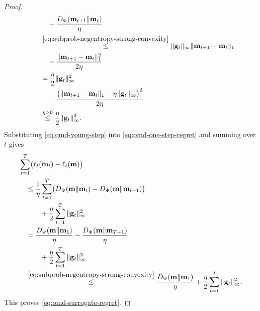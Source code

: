 \documentclass[journal]{IEEEtran}
\theoremstyle{remark}
\begin{document}
\begin{proof}
\begin{equation}
\begin{aligned}
&\qquad\quad-\frac{D_\Psi(\mathbf{m}_{t+1}\|\mathbf{m}_t)}{\eta}\\
&\qquad\overset{\eqref{eq:subprob-negentropy-strong-convexity}}{\le}
\|\mathbf{g}_t\|_\infty\|\mathbf{m}_{t+1}-\mathbf{m}_t\|_1\\
&\qquad\quad-\frac{\|\mathbf{m}_{t+1}-\mathbf{m}_t\|_1^2}{2\eta} \\
&\qquad=\frac{\eta}{2}\|\mathbf{g}_t\|_\infty^2\\
&\qquad\quad-\frac{\bigl(\|\mathbf{m}_{t+1}-\mathbf{m}_t\|_1
-\eta\|\mathbf{g}_t\|_\infty\bigr)^2}{2\eta}\\
&\qquad\overset{\eta>0}{\le}
\frac{\eta}{2}\|\mathbf{g}_t\|_\infty^2.
\end{aligned}
\end{equation}
Substituting \eqref{eq:omd-young-step} into
\eqref{eq:omd-one-step-regret} and summing over $t$ gives
\[
\begin{aligned}
&\sum_{t=1}^T\bigl(\ell_t(\mathbf{m}_t)-\ell_t(\mathbf{m})\bigr)\\
&\quad\le\frac{1}{\eta}\sum_{t=1}^T
\bigl(D_\Psi(\mathbf{m}\|\mathbf{m}_t)
-D_\Psi(\mathbf{m}\|\mathbf{m}_{t+1})\bigr)\\
&\qquad\quad+
\frac{\eta}{2}\sum_{t=1}^T\|\mathbf{g}_t\|_\infty^2\\
&\quad=\frac{D_\Psi(\mathbf{m}\|\mathbf{m}_1)}{\eta}
-\frac{D_\Psi(\mathbf{m}\|\mathbf{m}_{T+1})}{\eta}\\
&\qquad\quad+
\frac{\eta}{2}\sum_{t=1}^T\|\mathbf{g}_t\|_\infty^2\\
&\quad\overset{\eqref{eq:subprob-negentropy-strong-convexity}}{\le}
\frac{D_\Psi(\mathbf{m}\|\mathbf{m}_1)}{\eta}+
\frac{\eta}{2}\sum_{t=1}^T\|\mathbf{g}_t\|_\infty^2.
\end{aligned}
\]
This proves \eqref{eq:omd-surrogate-regret}.
\end{proof}
\end{document}
